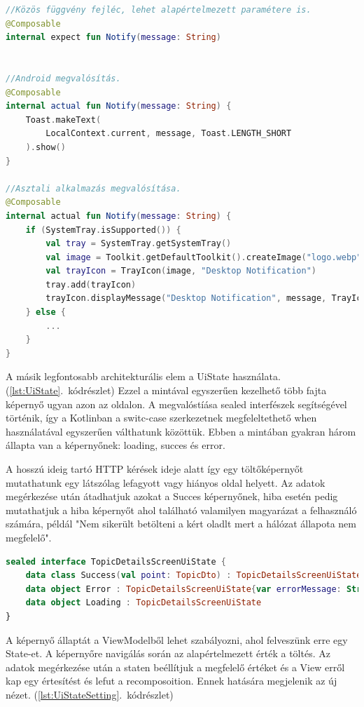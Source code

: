 \begin{lstlisting}[caption={Egyszerűbb példa az expect és actual függvények használatára. Debugolás során használt kódrészlet.}, label={lst:ExpectActualSample}, language=Kotlin]
//Közös függvény fejléc, lehet alapértelmezett paramétere is.
@Composable
internal expect fun Notify(message: String)


//Android megvalósítás.
@Composable
internal actual fun Notify(message: String) {
    Toast.makeText(
        LocalContext.current, message, Toast.LENGTH_SHORT
    ).show()
}

//Asztali alkalmazás megvalósítása.
@Composable
internal actual fun Notify(message: String) {
    if (SystemTray.isSupported()) {
        val tray = SystemTray.getSystemTray()
        val image = Toolkit.getDefaultToolkit().createImage("logo.webp")
        val trayIcon = TrayIcon(image, "Desktop Notification")
        tray.add(trayIcon)
        trayIcon.displayMessage("Desktop Notification", message, TrayIcon.MessageType.INFO)
    } else {
        ...
    }
}
\end{lstlisting}


A másik legfontosabb architekturális elem a UiState használata. (\ref{lst:UiState}.~kódrészlet)
Ezzel a mintával egyszerűen kezelhető több fajta képernyő ugyan azon az oldalon. 
A megvalóstíása sealed interfészek segítségével történik, így a Kotlinban a switc-case szerkezetnek megfeleltethető when használatával egyszerűen válthatunk közöttük.
Ebben a mintában gyakran három állapta van a képernyőnek: loading, succes és error. 

A hosszú ideig tartó HTTP kérések ideje alatt így egy töltőképernyőt mutathatunk egy látszólag lefagyott vagy hiányos oldal helyett.
Az adatok megérkezése után átadhatjuk azokat a Succes képernyőnek, hiba esetén pedig mutathatjuk a hiba képernyőt ahol található valamilyen magyarázat a felhasználó számára, példál "Nem sikerült betölteni a kért oladlt mert a hálózat állapota nem megfelelő".

\begin{lstlisting}[caption={UiState megvalóstása}, label={lst:UiState}, language=Kotlin]
sealed interface TopicDetailsScreenUiState {
    data class Success(val point: TopicDto) : TopicDetailsScreenUiState
    data object Error : TopicDetailsScreenUiState{var errorMessage: String = ""}
    data object Loading : TopicDetailsScreenUiState
}
\end{lstlisting}



A képernyő állaptát a ViewModelből lehet szabályozni, ahol felveszünk erre egy State-et. A képernyőre navigálás során az alapértelmezett érték a töltés.
Az adatok megérkezése után a staten beéllítjuk a megfelelő értéket és a View erről kap egy értesítést és lefut a recomposoition. Ennek hatására megjelenik az új nézet.
(\ref{lst:UiStateSetting}.~kódrészlet)

